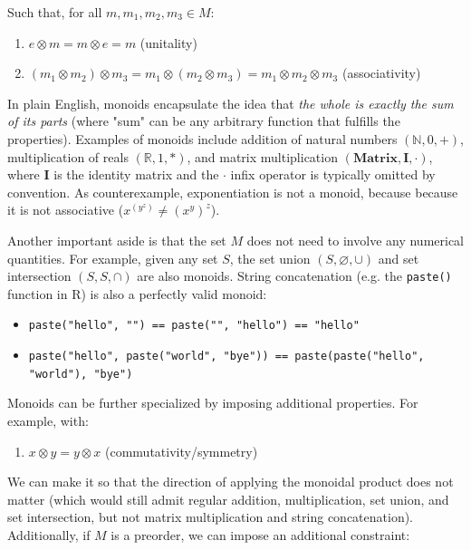 \documentclass[12pt,a4paper]{article}
\begin{document}
Such that, for all $m, m_1, m_2, m_3 \in M$: 

\begin{enumerate}
\renewcommand{\theenumi}{\alph{enumi}}
\item $e \otimes m = m \otimes e = m$ (unitality)
\item $(m_1 \otimes m_2) \otimes m_3 = m_1 \otimes (m_2 \otimes m_3) = m_1 \otimes m_2 \otimes m_3$ (associativity)
\end{enumerate}

In plain English, monoids encapsulate the idea that \textit{the whole is exactly the sum of its parts} (where "sum" can be any arbitrary function that fulfills the properties). Examples of monoids include addition of natural numbers $(\mathbb{N}, 0, +)$, multiplication of reals $(\mathbb{R}, 1, *)$, and matrix multiplication $(\mathbf{Matrix}, \mathbf{I}, \cdot)$, where $\mathbf{I}$ is the identity matrix and the $\cdot$ infix operator is typically omitted by convention. As counterexample, exponentiation is not a monoid, because because it is not associative ($x^{(y^z)} \neq (x^y)^z$). 

Another important aside is that the set $M$ does not need to involve any numerical quantities. For example, given any set $S$, the set union $(S, \varnothing, \cup)$ and set intersection $(S, S, \cap)$ are also monoids. String concatenation (e.g. the \texttt{paste()} function in R) is also a perfectly valid monoid: 

\begin{itemize}
\item \texttt{paste("hello", "") == paste("", "hello") == "hello"}
\item \texttt{paste("hello", paste("world", "bye")) == paste(paste("hello", "world"), "bye")}
\end{itemize}

Monoids can be further specialized by imposing additional properties. For example, with:

\begin{enumerate}
\renewcommand{\theenumi}{\alph{enumi}}
\setcounter{enumi}{2}
\item $x \otimes y = y \otimes x$ (commutativity/symmetry)
\end{enumerate}

We can make it so that the direction of applying the monoidal product does not matter (which would still admit regular addition, multiplication, set union, and set intersection, but not matrix multiplication and string concatenation). Additionally, if $M$ is a preorder, we can impose an additional constraint:
\end{document}
